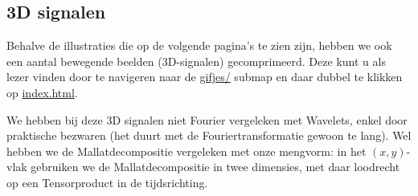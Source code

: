 \subsection{3D signalen}
Behalve de illustraties die op de volgende pagina's te zien zijn, hebben we ook een aantal bewegende beelden (3D-signalen) gecomprimeerd. Deze kunt u als lezer vinden door te navigeren naar de \url{gifjes/} submap en daar dubbel te klikken op \url{index.html}.

We hebben bij deze 3D signalen niet Fourier vergeleken met Wavelets, enkel door praktische bezwaren (het duurt met de Fouriertransformatie gewoon te lang). Wel hebben we de Mallatdecompositie vergeleken met onze mengvorm: in het $(x,y)$-vlak gebruiken we de Mallatdecompositie in twee dimensies, met daar loodrecht op een Tensorproduct in de tijdsrichting.

